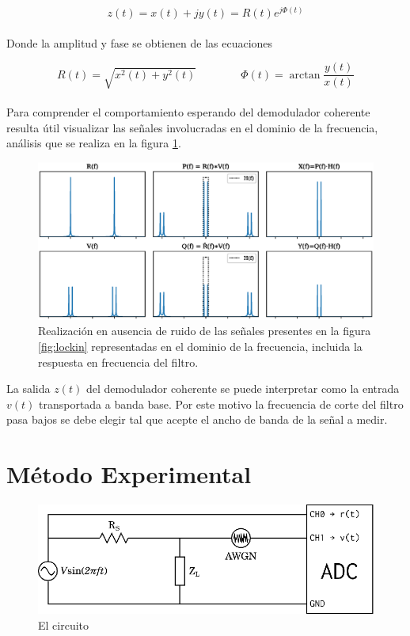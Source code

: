 \documentclass[11pt,a4paper]{extarticle}
\begin{document}
\begin{multicols}{2}
\begin{equation*}
	z(t) = x(t) + j y(t) = R(t) e ^{j\Phi(t)}
\end{equation*}\\[-1em]

Donde la amplitud y fase se obtienen de las ecuaciones

\begin{equation*}
	R(t) = \sqrt{x^2(t)+y^2(t)} \qquad \qquad \Phi(t) = \arctan\frac{y(t)}{x(t)}
\end{equation*}\\


Para comprender el comportamiento esperando del demodulador coherente resulta útil visualizar las señales involucradas en el dominio de la frecuencia, análisis que se realiza en la figura \ref{fig:sigs_fourier}.

\begin{figure}[H]
	\centering
	\includegraphics[width=\linewidth]{Images/sigs_fourier.eps}
	\caption{Realización en ausencia de ruido de las señales presentes en la figura \ref{fig:lockin} representadas en el dominio de la frecuencia, incluida la respuesta en frecuencia del filtro.}
	\label{fig:sigs_fourier}
\end{figure}

La salida $z(t)$ del demodulador coherente se puede interpretar como la entrada $v(t)$ transportada a banda base. Por este motivo la frecuencia de corte del filtro pasa bajos se debe elegir tal que acepte el ancho de banda de la señal a medir.

\section{Método Experimental}
\begin{figure}[H]
	\centering
	\includegraphics[width=\linewidth]{Images/circuito.eps}
	\caption{El circuito}
	\label{fig:circuito}
\end{figure}


\end{multicols}
\end{document}
